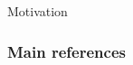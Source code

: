 \documentclass{beamer}
\begin{document}
\begin{frame}{Motivation}{}
%  
%
%        
%
%
% 
%  
\end{frame}


\begin{frame}[allowframebreaks]
        \frametitle{Main references}
        
        
\end{frame}

\end{document}
